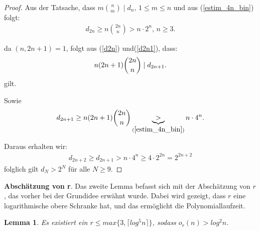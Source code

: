 \documentclass[12pt,oneside]{article}
\newtheorem{lemma}[theorem]{Lemma}
\theoremstyle{remark}
\theoremstyle{definition}
\begin{document}
\begin{proof}
Aus der Tatsache, dass $m{n \choose m} \mid d_n, \, 1 \leq m \leq n$ und aus (\ref{estim_4n_bin}) folgt:
\begin{align*}
    d_{2n} \geq n {2n \choose n} > n \cdot 2^n, \, n \geq 3.
\end{align*}

da $(n, 2n +1) = 1 $, folgt aus (\ref{d2n}) und(\ref{d2n1}), dass:\newline\newline 
\begin{equation}\label{helps}
    n(2n + 1) {2n \choose n} \mid d_{2n + 1}.\newline\newline
\end{equation}
gilt.\newline\newline

Sowie 
\begin{equation}
    d_{2n + 1} \geq  n(2n + 1) {2n \choose n} \underbrace{>}_{(\ref{estim_4n_bin})} n\cdot 4^n.
\end{equation}

Daraus erhalten wir:
\begin{align*}
d_{2n + 2} \geq d_{2n + 1} > n \cdot 4^n \geq 4 \cdot 2^{2n} = 2^{2n + 2}
\end{align*}
folglich gilt $d_N > 2^N$ für alle $N \geq 9$.
\end{proof}

\textbf{Abschätzung von r}.\newline\newline
Das zweite Lemma befasst sich mit der Abschätzung von $r$, das vorher bei der Grundidee erwähnt wurde. Dabei wird gezeigt, dass $r$ eine logarithmische obere Schranke hat, und das ermöglicht die Polynomiallaufzeit.  

\begin{lemma}
Es existiert ein $ r \leq max \{ 3, \lceil log^5 n \rceil \}$, sodass $o_{r}(n) > log^2 n$.
\end{lemma}
\end{document}
